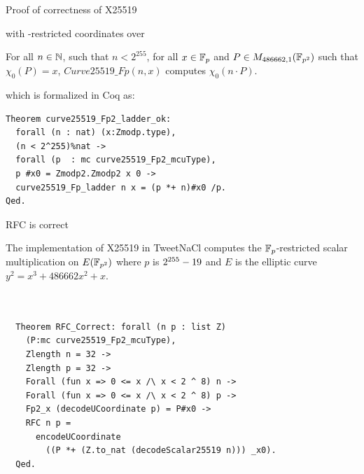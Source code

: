 \documentclass[8pt,aspectratio=169]{beamer}
\begin{document}
\begin{frame}[fragile]{Proof of correctness of X25519}
\end{frame}

%
%
\begin{frame}[fragile]{with -restricted coordinates over }
	\begin{theorem}
		\label{thm:general-scalarmult}
		For all $n \in \mathbb{N}$, such that $n < 2^{255}$,
		for all $x \in \mathbb{F}_{p}$ and $P \in M_{486662,1}(\mathbb{F}_{p^2})$ such that $\chi_0(P) = x$,
		$Curve25519\_Fp(n,x)$ computes $\chi_0(n \cdot P)$.
	\end{theorem}
	which is formalized in Coq as:
	\begin{lstlisting}[language=Coq, basicstyle=\normalsize]
Theorem curve25519_Fp2_ladder_ok:
  forall (n : nat) (x:Zmodp.type),
  (n < 2^255)%nat ->
  forall (p  : mc curve25519_Fp2_mcuType),
  p #x0 = Zmodp2.Zmodp2 x 0 ->
  curve25519_Fp_ladder n x = (p *+ n)#x0 /p.
Qed.
\end{lstlisting}

\end{frame}


%
%
\begin{frame}[fragile]{RFC is correct}
	\begin{informaltheorem}
		The implementation of X25519 in TweetNaCl computes the
		$\mathbb{F}_{p}$-restricted \xcoord scalar multiplication on $E(\mathbb{F}_{p^2})$ where $p$ is $2^{255}-19$
		and $E$ is the elliptic curve $y^2 = x^3 + 486662 x^2 + x$.
	\end{informaltheorem}

	\begin{lstlisting}[language=Coq, basicstyle=\normalsize]


  Theorem RFC_Correct: forall (n p : list Z)
    (P:mc curve25519_Fp2_mcuType),
    Zlength n = 32 ->
    Zlength p = 32 ->
    Forall (fun x => 0 <= x /\ x < 2 ^ 8) n ->
    Forall (fun x => 0 <= x /\ x < 2 ^ 8) p ->
    Fp2_x (decodeUCoordinate p) = P#x0 ->
    RFC n p =
      encodeUCoordinate
        ((P *+ (Z.to_nat (decodeScalar25519 n))) _x0).
  Qed.
  \end{lstlisting}
\end{frame}
\end{document}
